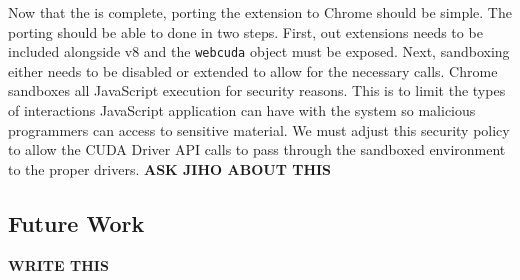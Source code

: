 Now that the \name is complete, porting the extension to Chrome should be
simple. The porting should be able to done in two steps. First, out extensions
needs to be included alongside v8 and the \texttt{webcuda} object must be
exposed.  Next, sandboxing either needs to be disabled or extended to allow for
the necessary \name calls. Chrome sandboxes all JavaScript execution for
security reasons. This is to limit the types of interactions JavaScript
application can have with the system so malicious programmers can access to
sensitive material. We must adjust this security policy to allow the CUDA Driver
API calls to pass through the sandboxed environment to the proper drivers. {\bf ASK JIHO
ABOUT THIS}


\subsection{Future Work}
\label{future}

{\bf WRITE THIS}


